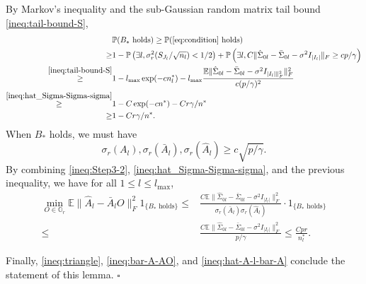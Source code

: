\documentclass[11pt]{article}
\newcommand{\0}{{\mathbf{0}}}
\newcommand{\1}{{\mathbf{1}}}
\begin{document}
\begin{enumerate}[leftmargin=*]
	By Markov's inequality and the sub-Gaussian random matrix tail bound \eqref{ineq:tail-bound-S},
	\begin{equation}\label{ineq:PB-ast}
	\begin{split}
	& \mathbb{P}(B_\ast \text{ holds}) \geq \mathbb{P}(\eqref{eq:condition} \text{ holds}) \\
	\geq & 1 - \mathbb{P}\left(\exists l, \sigma_r^2(S_{J_l}/\sqrt{n_l}) < 1/2\right) + \mathbb{P}\left(\exists l, C\|\hat{\Sigma}_{0l} - \bar{\Sigma}_{0l}-\sigma^2I_{|I_l|}\|_F \geq cp/\gamma\right) \\
	\overset{\eqref{ineq:tail-bound-S}}{\geq} & 1 - l_{\max} \exp(-cn_l^\ast) - l_{\max} \frac{\mathbb{E}\|\hat{\Sigma}_{0l}-\bar{\Sigma}_{0l}-\sigma^2I_{|I_l|\|_F^2}\|_F^2}{c(p/\gamma)^2}\\ \overset{\eqref{ineq:hat_Sigma-Sigma-sigma}}{\geq} & 1 - C\exp(-cn^\ast) - Cr\gamma/n^\ast\\
	\geq & 1 - Cr\gamma/n^\ast.
	\end{split}
	\end{equation}
	When $B_\ast$ holds, we must have
	\begin{equation*}
	\sigma_r(A_l), \sigma_r(\bar{A}_l), \sigma_r(\hat{A}_l)\geq c\sqrt{p/\gamma}.
	\end{equation*}
	By combining \eqref{ineq:Step3-2}, \eqref{ineq:hat_Sigma-Sigma-sigma}, and the previous inequality, we have for all $1\leq l \leq l_{\max}$,
	\begin{equation}\label{ineq:hat-A-l-bar-A}
	\begin{split}
	\min_{O\in \mathbb{O}_r} \mathbb{E}\|\hat{A}_l - \bar{A}_lO\|_F^2 1_{\{B_\ast \text{ holds}\}} \leq & \frac{C\mathbb{E}\|\hat{\Sigma}_{0l} - \bar{\Sigma}_{0l} - \sigma^2I_{|I_l|}\|_F^2}{\sigma_r(\bar{A}_l)\sigma_r(\hat{A}_l)}\cdot 1_{\{B_\ast \text{ holds}\}} \\
	\leq & \frac{C\mathbb{E}\|\hat{\Sigma}_{0l} - \bar{\Sigma}_{0l} - \sigma^2I_{|I_l|}\|_F^2}{p/\gamma} \leq \frac{Cpr}{n_l^\ast}.
	\end{split}
	\end{equation}
\end{enumerate}
Finally, \eqref{ineq:triangle}, \eqref{ineq:bar-A-AO}, and \eqref{ineq:hat-A-l-bar-A} conclude the statement of this lemma. \quad $\square$
\end{document}
